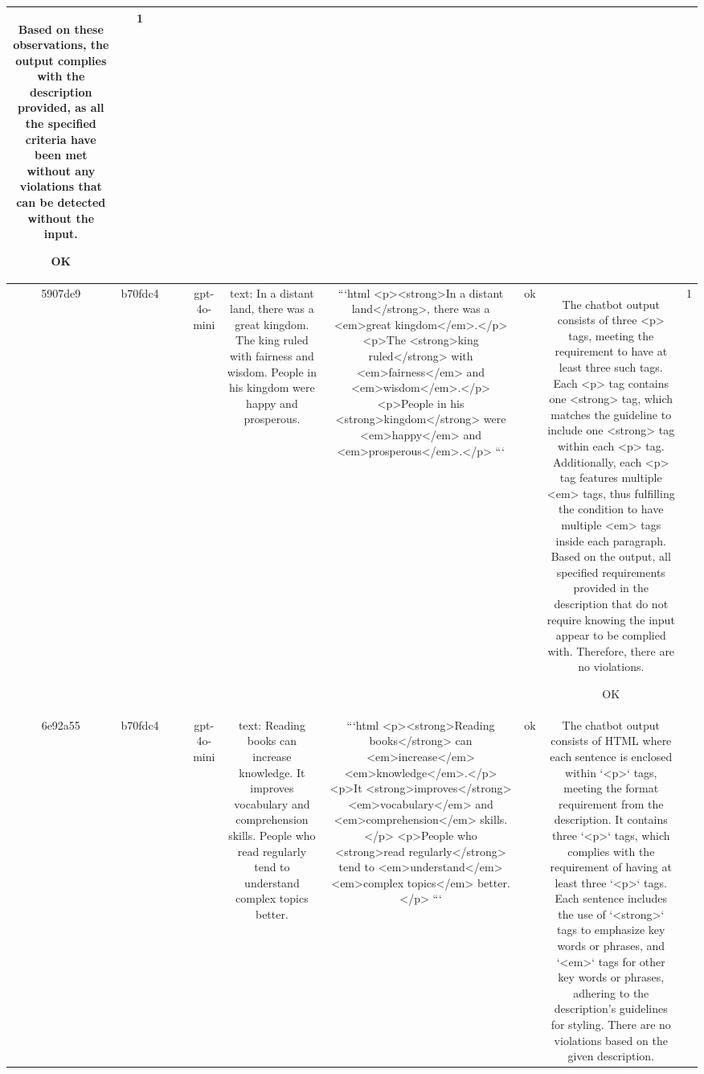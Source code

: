 \begin{table}[h!]
\begin{tabular}{|c|c|c|c|c|c|c|c|c|c|}
Based on these observations, the output complies with the description provided, as all the specified criteria have been met without any violations that can be detected without the input. 

OK & 1\\
\hline
5907de9 & b70fdc4 &  &  & gpt-4o-mini & text: In a distant land, there was a great kingdom. The king ruled with fairness and wisdom. People in his kingdom were happy and prosperous. & ```html
<p><strong>In a distant land</strong>, there was a <em>great kingdom</em>.</p>
<p>The <strong>king ruled</strong> with <em>fairness</em> and <em>wisdom</em>.</p>
<p>People in his <strong>kingdom</strong> were <em>happy</em> and <em>prosperous</em>.</p>
``` & ok & The chatbot output consists of three <p> tags, meeting the requirement to have at least three such tags. Each <p> tag contains one <strong> tag, which matches the guideline to include one <strong> tag within each <p> tag. Additionally, each <p> tag features multiple <em> tags, thus fulfilling the condition to have multiple <em> tags inside each paragraph. Based on the output, all specified requirements provided in the description that do not require knowing the input appear to be complied with. Therefore, there are no violations.

OK & 1\\
\hline
6e92a55 & b70fdc4 &  &  & gpt-4o-mini & text: Reading books can increase knowledge. It improves vocabulary and comprehension skills. People who read regularly tend to understand complex topics better. & ```html
<p><strong>Reading books</strong> can <em>increase</em> <em>knowledge</em>.</p>
<p>It <strong>improves</strong> <em>vocabulary</em> and <em>comprehension</em> skills.</p>
<p>People who <strong>read regularly</strong> tend to <em>understand</em> <em>complex topics</em> better.</p>
``` & ok & The chatbot output consists of HTML where each sentence is enclosed within `<p>` tags, meeting the format requirement from the description. It contains three `<p>` tags, which complies with the requirement of having at least three `<p>` tags. Each sentence includes the use of `<strong>` tags to emphasize key words or phrases, and `<em>` tags for other key words or phrases, adhering to the description's guidelines for styling. There are no violations based on the given description.


\end{tabular}
\end{table}
